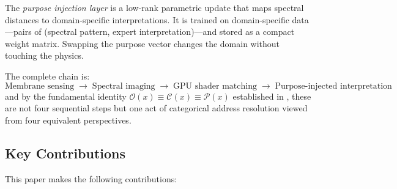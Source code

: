 \documentclass[11pt,twocolumn,a4paper]{article}
\theoremstyle{definition}
\theoremstyle{remark}
\newcommand{\Obs}{\mathcal{O}}
\newcommand{\Comp}{\mathcal{C}}
\newcommand{\Proc}{\mathcal{P}}
\begin{document}
The \emph{purpose injection layer} is a low-rank parametric update that maps spectral distances to domain-specific interpretations.  It is trained on domain-specific data---pairs of (spectral pattern, expert interpretation)---and stored as a compact weight matrix.  Swapping the purpose vector changes the domain without touching the physics.

The complete chain is:
\begin{equation}\label{eq:chain}
    \text{Membrane sensing} \;\longrightarrow\; \text{Spectral imaging} \;\longrightarrow\; \text{GPU shader matching} \;\longrightarrow\; \text{Purpose-injected interpretation}
\end{equation}
and by the fundamental identity $\Obs(x) \equiv \Comp(x) \equiv \Proc(x)$ established in \citet{sachikonye2026metacognitive}, these are not four sequential steps but one act of categorical address resolution viewed from four equivalent perspectives.

\subsection{Key Contributions}

This paper makes the following contributions:
\end{document}
